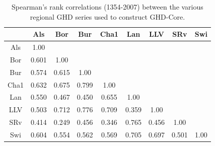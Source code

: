 \documentclass[12pt]{article}
\begin{document}
\begin{table}
\small
\caption{\small Spearman's rank correlations (1354-2007) between the various regional GHD series used to construct GHD-Core.}
\centering
\begin{tabular}{c c c c c c c c c}
\hline
& Als & Bor & Bur & Cha1 & Lan & LLV & SRv & Swi \\
\hline
Als &1.00 &  &  &  &  &  &  & \\
Bor & 0.601 & 1.00 &  &  &  &  &  & \\
Bur & 0.574 & 0.615 & 1.00 &  &  &  &  & \\
Cha1 & 0.632 & 0.675 & 0.799 & 1.00 &  &  &  & \\
Lan & 0.550 & 0.467 & 0.450 & 0.655 & 1.00 &  &  & \\
LLV & 0.503 & 0.712 & 0.776 & 0.709 & 0.359 & 1.00 &  & \\
SRv & 0.414 & 0.249 & 0.456 & 0.346 & 0.765 & 0.456 & 1.00 & \\
Swi & 0.604 & 0.554 & 0.562 & 0.569 & 0.705 & 0.697 & 0.501 & 1.00\\
\hline
\end{tabular}
\end{table}
\end{document}
